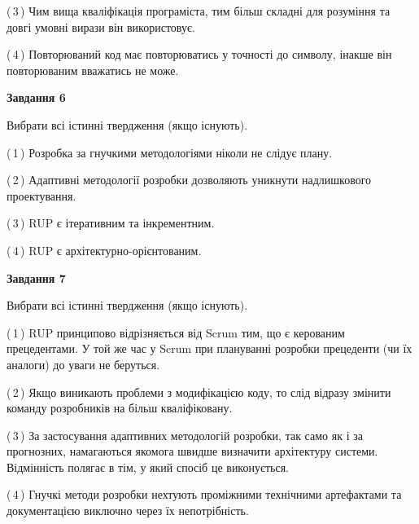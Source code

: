 \documentclass[10pt, ukrainian]{article}
\begin{document}
{\begin {large}
(\,3\,) Чим вища кваліфікація програміста, тим більш складні для розуміння та довгі умовні вирази він використовує. %



(\,4\,) Повторюваний код має повторюватись у точності до символу, інакше він повторюваним вважатись не може. %

\newpage

{\begin {center}\textbf{Завдання 6}\end {center}}\par
Вибрати всі істинні твердження (якщо існують).\par
\vspace{2mm}



(\,1\,) Розробка за гнучкими методологіями ніколи не слідує плану. %



(\,2\,) Адаптивні методології розробки дозволяють уникнути надлишкового проектування. %



(\,3\,) RUP є ітеративним та інкрементним.%



(\,4\,) RUP є архітектурно-орієнтованим. %


{\begin {center}\textbf{Завдання 7}\end {center}}\par
Вибрати всі істинні твердження (якщо існують).\par
\vspace{2mm}



(\,1\,) RUP принципово відрізняється від Scrum тим, що є керованим прецедентами. У той же час у Scrum при плануванні розробки прецеденти (чи їх аналоги) до уваги не беруться. %



(\,2\,) Якщо виникають проблеми з модифікацією коду, то слід відразу змінити команду розробників на більш кваліфіковану.%



(\,3\,) За застосування адаптивних методологій розробки, так само як і за прогнозних, намагаються якомога швидше визначити архітектуру системи. Відмінність полягає в тім, у який спосіб це виконується.%



(\,4\,) Гнучкі методи розробки нехтують проміжними технічними артефактами та документацією виключно через їх непотрібність. %



\end{large}}
\end{document}
